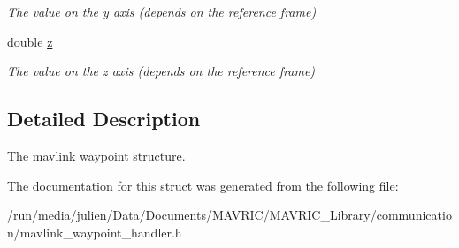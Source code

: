\begin{DoxyCompactItemize}
\begin{DoxyCompactList}\small\item\em The value on the y axis (depends on the reference frame) \end{DoxyCompactList}\item 
\hypertarget{structwaypoint__struct_a065cb53ce912024c2d626c26fb4f5016}{double \hyperlink{structwaypoint__struct_a065cb53ce912024c2d626c26fb4f5016}{z}}\label{structwaypoint__struct_a065cb53ce912024c2d626c26fb4f5016}

\begin{DoxyCompactList}\small\item\em The value on the z axis (depends on the reference frame) \end{DoxyCompactList}\end{DoxyCompactItemize}


\subsection{Detailed Description}
The mavlink waypoint structure. 

The documentation for this struct was generated from the following file\+:\begin{DoxyCompactItemize}
\item 
/run/media/julien/\+Data/\+Documents/\+M\+A\+V\+R\+I\+C/\+M\+A\+V\+R\+I\+C\+\_\+\+Library/communication/mavlink\+\_\+waypoint\+\_\+handler.\+h\end{DoxyCompactItemize}

